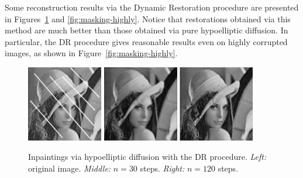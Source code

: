 \documentclass[proc]{edpsmath}
\begin{document}
Some reconstruction results via the Dynamic Restoration procedure are presented in Figures~\ref{fig:masking} and \ref{fig:masking-highly}. Notice that restorations obtained via this method are much better than those obtained via pure hypoelliptic diffusion. In particular, the DR procedure gives reasonable results even on highly corrupted images, as shown in Figure~\ref{fig:masking-highly}.

\begin{figure}
  \includegraphics[height=3.3cm]{imgs/lena-diag}\qquad
  \includegraphics[height = 3.3cm]{imgs/lena-masking-30}\qquad
  \includegraphics[height = 3.3cm]{imgs/lena-masking-120}
  \caption{Inpaintings via {hypoelliptic diffusion with} the DR procedure.
  \emph{Left: }original image. \emph{Middle:}  $n=30$ steps. \emph{Right: }$n=120$ steps.}
  \label{fig:masking}
\end{figure}
\end{document}
